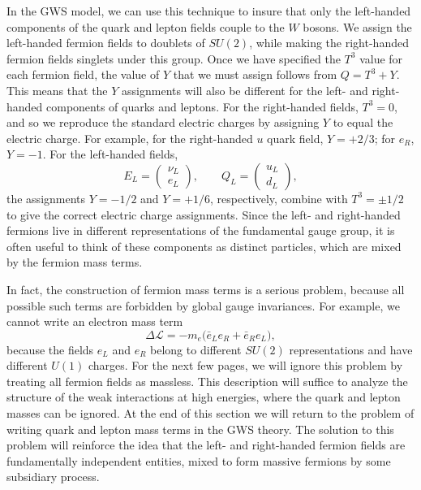 In the GWS model, we can use this technique to insure that only the
left-handed components of the quark and lepton fields couple to the $W$
bosons.  We assign the left-handed fermion fields to doublets of $SU(2)$,
while making the right-handed fermion fields singlets under this group.
Once we have specified the $T^3$ value for each fermion field, the value of
$Y$ that we must assign follows from $Q = T^3 + Y$.  This means that the $Y$
assignments will also be different for the left- and right-handed components
of quarks and leptons.  For the right-handed fields, $T^3 = 0$, and so we
reproduce the standard electric charges by assigning $Y$ to equal the
electric charge.  For example, for the right-handed $u$ quark field,
$Y = +2/3$; for $e_R$, $Y = -1$.  For the left-handed fields,
\begin{equation}
  E_L = \begin{pmatrix}\nu_L\\ e_L\end{pmatrix},\qquad
  Q_L = \begin{pmatrix}u_L\\ d_L\end{pmatrix} ,
  \label{eq:20.75}
\end{equation}
the assignments $Y = -1/2$ and $Y = +1/6$, respectively, combine with
$T^3 = \pm 1/2$ to give the correct electric charge assignments.  Since the
left- and right-handed fermions live in different representations of the
fundamental gauge group, it is often useful to think of these components as
distinct particles, which are mixed by the fermion mass terms.

In fact, the construction of fermion mass terms is a serious problem, because
all possible such terms are forbidden by global gauge invariances.  For
example, we cannot write an electron mass term
\begin{equation}
  \Delta\mathcal{L} = -m_e\bigl( \bar{e}_Le_R + \bar{e}_Re_L \bigr) ,
  \label{eq:20.76}
\end{equation}
because the fields $e_L$ and $e_R$ belong to different $SU(2)$
representations and have different $U(1)$ charges.  For the next few pages, we
will ignore this problem by treating all fermion fields as massless.  This
description will suffice to analyze the structure of the weak interactions at
high energies, where the quark and lepton masses can be ignored.  At the end
of this section we will return to the problem of writing quark and lepton
mass terms in the GWS theory.  The solution to this problem will reinforce the
idea that the left- and right-handed fermion fields are fundamentally
independent entities, mixed to form massive fermions by some subsidiary
process.

